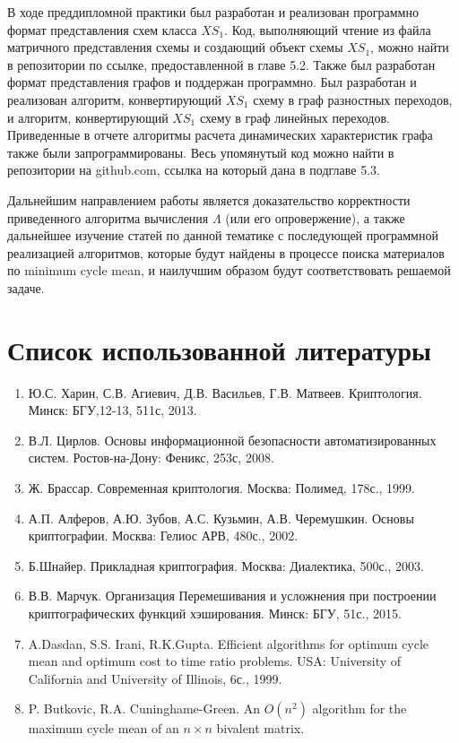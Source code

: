 \documentclass[a4paper,12pt]{extarticle}
\theoremstyle{plain} %
\begin{document}
\begin{large}
В ходе преддипломной практики был разработан и реализован программно формат представления схем класса $XS_1$. Код, выполняющий чтение из файла матричного представления схемы и создающий объект схемы $XS_1$, можно найти в репозитории по ссылке, предоставленной в главе 5.2. Также был разработан формат представления графов и поддержан программно. Был разработан и реализован алгоритм, конвертирующий $XS_1$ схему в граф разностных переходов, и алгоритм, конвертирующий $XS_1$ схему в граф линейных переходов. Приведенные в отчете алгоритмы расчета динамических характеристик графа также были запрограммированы. Весь упомянутый код можно найти в репозитории на github.com, ссылка на который дана в подглаве 5.3.

Дальнейшим направлением работы является доказательство корректности приведенного алгоритма вычисления $\Lambda$ (или его опровержение), а также дальнейшее изучение статей по данной тематике с последующей программной реализацией алгоритмов, которые будут найдены в процессе поиска материалов по minimum cycle mean, и наилучшим образом будут соответствовать решаемой задаче.

\newpage
\section*{Список использованной литературы}
\vspace*{1cm}

\begin{enumerate}
\item Ю.С. Харин, С.В. Агиевич, Д.В. Васильев, Г.В. Матвеев. Криптология.  Минск: БГУ,12-13, 511с, 2013.
\item В.Л. Цирлов. Основы информационной безопасности автоматизированных систем. Ростов-на-Дону: Феникс, 253с, 2008.
\item Ж. Брассар. Современная криптология. Москва: Полимед, 178с., 1999.
\item А.П. Алферов, А.Ю. Зубов, А.С. Кузьмин, А.В. Черемушкин. Основы криптографии. Москва: Гелиос АРВ, 480с., 2002.
\item Б.Шнайер. Прикладная криптография. Москва: Диалектика, 500с., 2003.
\item В.В. Марчук. Организация Перемешивания и усложнения при построении криптографических функций хэширования. Минск: БГУ, 51с., 2015.
\item A.Dasdan, S.S. Irani, R.K.Gupta. Efficient algorithms for optimum cycle mean and optimum cost to time ratio problems. USA: University of California and University of Illinois, 6с., 1999.
\item P. Butkovic, R.A. Cuninghame-Green. An $O(n^2)$ algorithm for the maximum cycle mean of an $n \times n$ bivalent matrix. 
\end{enumerate}
\end{large}
\end{document}

